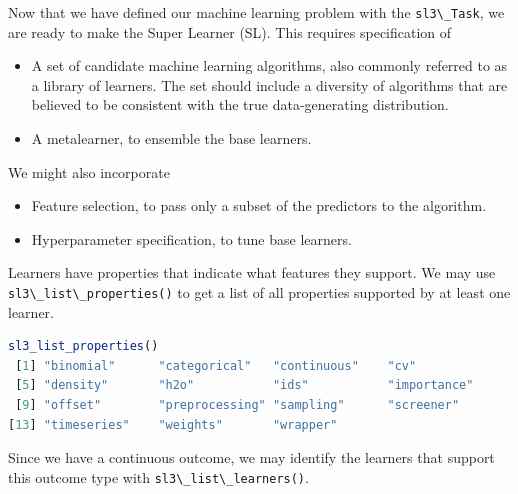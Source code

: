 \documentclass[
  12pt, krantz2,
]{book}
\newcommand{\passthrough}[1]{#1}
\providecommand{\tightlist}{%
  \setlength{\itemsep}{0pt}\setlength{\parskip}{0pt}}
\theoremstyle{definition}
\theoremstyle{definition}
\theoremstyle{definition}
\newcommand{\1}{\mathbbm{1}}
\begin{document}
Now that we have defined our machine learning problem with the \passthrough{\lstinline!sl3\_Task!}, we
are ready to make the Super Learner (SL). This requires specification of

\begin{itemize}
\tightlist
\item
  A set of candidate machine learning algorithms, also commonly referred to as
  a library of learners. The set should include a diversity of algorithms
  that are believed to be consistent with the true data-generating distribution.
\item
  A metalearner, to ensemble the base learners.
\end{itemize}

We might also incorporate

\begin{itemize}
\tightlist
\item
  Feature selection, to pass only a subset of the predictors to the algorithm.
\item
  Hyperparameter specification, to tune base learners.
\end{itemize}

Learners have properties that indicate what features they support. We may use
\passthrough{\lstinline!sl3\_list\_properties()!} to get a list of all properties supported by at least
one learner.

\begin{lstlisting}[language=R]
sl3_list_properties()
 [1] "binomial"      "categorical"   "continuous"    "cv"           
 [5] "density"       "h2o"           "ids"           "importance"   
 [9] "offset"        "preprocessing" "sampling"      "screener"     
[13] "timeseries"    "weights"       "wrapper"      
\end{lstlisting}

Since we have a continuous outcome, we may identify the learners that support
this outcome type with \passthrough{\lstinline!sl3\_list\_learners()!}.
\end{document}
